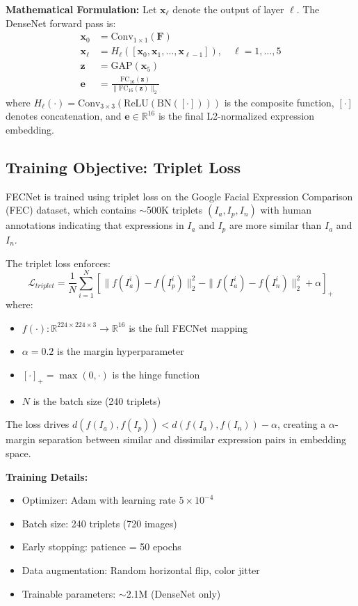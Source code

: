 \documentclass[10pt,twocolumn]{article}
\begin{document}
\textbf{Mathematical Formulation:}
Let $\mathbf{x}_\ell$ denote the output of layer $\ell$. The DenseNet forward pass is:
\begin{align}
\mathbf{x}_0 &= \text{Conv}_{1 \times 1}(\mathbf{F}) \\
\mathbf{x}_\ell &= H_\ell([\mathbf{x}_0, \mathbf{x}_1, \ldots, \mathbf{x}_{\ell-1}]), \quad \ell = 1, \ldots, 5 \\
\mathbf{z} &= \text{GAP}(\mathbf{x}_5) \\
\mathbf{e} &= \frac{\text{FC}_{16}(\mathbf{z})}{\|\text{FC}_{16}(\mathbf{z})\|_2}
\end{align}
where $H_\ell(\cdot) = \text{Conv}_{3 \times 3}(\text{ReLU}(\text{BN}([\cdot])))$ is the composite function, $[\cdot]$ denotes concatenation, and $\mathbf{e} \in \mathbb{R}^{16}$ is the final L2-normalized expression embedding.

\subsection{Training Objective: Triplet Loss}
FECNet is trained using triplet loss on the Google Facial Expression Comparison (FEC) dataset, which contains $\sim$500K triplets $(I_a, I_p, I_n)$ with human annotations indicating that expressions in $I_a$ and $I_p$ are more similar than $I_a$ and $I_n$.

The triplet loss enforces:
\begin{equation}
\mathcal{L}_{triplet} = \frac{1}{N} \sum_{i=1}^{N} \left[ \|f(I_a^i) - f(I_p^i)\|_2^2 - \|f(I_a^i) - f(I_n^i)\|_2^2 + \alpha \right]_+
\end{equation}
where:
\begin{itemize}
    \item $f(\cdot): \mathbb{R}^{224 \times 224 \times 3} \rightarrow \mathbb{R}^{16}$ is the full FECNet mapping
    \item $\alpha = 0.2$ is the margin hyperparameter
    \item $[\cdot]_+ = \max(0, \cdot)$ is the hinge function
    \item $N$ is the batch size (240 triplets)
\end{itemize}

The loss drives $d(f(I_a), f(I_p)) < d(f(I_a), f(I_n)) - \alpha$, creating a $\alpha$-margin separation between similar and dissimilar expression pairs in embedding space.

\textbf{Training Details:}
\begin{itemize}
    \item Optimizer: Adam with learning rate $5 \times 10^{-4}$
    \item Batch size: 240 triplets (720 images)
    \item Early stopping: patience = 50 epochs
    \item Data augmentation: Random horizontal flip, color jitter
    \item Trainable parameters: $\sim$2.1M (DenseNet only)
\end{itemize}
\end{document}
